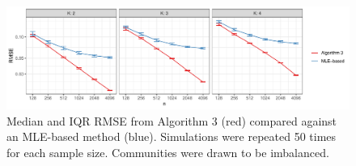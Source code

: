 \documentclass[
  12pt,
]{article}
\begin{document}
\begin{figure}[H]

{\centering \includegraphics{summary_files/figure-latex/lambda_est_k_imba-1} 

}

\caption{Median and IQR RMSE from Algorithm 3 (red) compared against an MLE-based method (blue). Simulations were repeated 50 times for each sample size. Communities were drawn to be imbalanced.}\label{fig:lambda_est_k_imba}
\end{figure}

\end{document}
